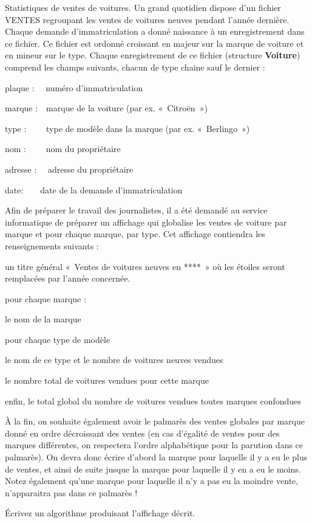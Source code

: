 \begin{Exercice}{Statistiques de ventes de voitures.}
	Un grand quotidien dispose d’un fichier VENTES regroupant les ventes de
	voitures neuves pendant l’année dernière. Chaque demande
	d’immatriculation a donné naissance à un enregistrement dans ce
	fichier. Ce fichier est ordonné croissant en majeur sur la marque de
	voiture et en mineur sur le type. Chaque enregistrement de ce fichier
	(structure \textbf{Voiture}) comprend les champs suivants, chacun de
	type chaine sauf le dernier :

	{	plaque : \ \ numéro d’immatriculation}

	{	marque :\ \ marque de la voiture (par ex. «~Citroën~»)}

	{	type : \ \ \ \ type de modèle dans la marque (par ex. «~Berlingo~»)}

	{	nom : \ \ \ \ nom du propriétaire}

	{	adresse : \ \ adresse du propriétaire}

	{	date:\ \ \ \ date de la demande d’immatriculation}

	Afin de préparer le travail des journalistes, il a été demandé au
	service informatique de préparer un affichage qui globalise les ventes
	de voiture par marque et pour chaque marque, par type. Cet affichage
	contiendra les renseignements suivants :

	\begin{liste}
		\item 
			un titre général «~Ventes de voitures neuves en ****~» où les étoiles
			seront remplacées par l’année concernée.
		\item 
			pour chaque marque :
			\begin{liste}
				\item 
					le nom de la marque
				\item 
					pour chaque type de modèle
				\item 
					le nom de ce type et le nombre de voitures neuves vendues
				\item 
					le nombre total de voitures vendues pour cette marque
			\end{liste}
		\item 
			enfin, le total global du nombre de voitures vendues toutes marques
			confondues
	\end{liste}
	
	À la fin, on souhaite également avoir le palmarès des ventes globales
	par marque donné en ordre décroissant des ventes (en cas d’égalité de
	ventes pour des marques différentes, on respectera l’ordre alphabétique
	pour la parution dans ce palmarès). On devra donc écrire d’abord la
	marque pour laquelle il y a eu le plus de ventes, et ainsi de suite
	jusque la marque pour laquelle il y en a eu le moins. Notez également
	qu’une marque pour laquelle il n’y a pas eu la moindre vente,
	n’apparaitra pas dans ce palmarès !

	Écrivez un algorithme produisant l'affichage décrit.
\end{Exercice}

